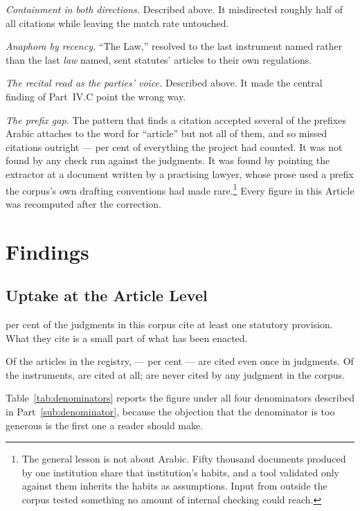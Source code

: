 \documentclass[12pt]{article}
\begin{document}
\emph{Containment in both directions.} Described above. It misdirected roughly
half of all citations while leaving the match rate untouched.

\emph{Anaphora by recency.} ``The Law,'' resolved to the last instrument named
rather than the last \emph{law} named, sent statutes' articles to their own
regulations.

\emph{The recital read as the parties' voice.} Described above. It made the
central finding of Part~IV.C point the wrong way.

\emph{The prefix gap.} The pattern that finds a citation accepted several of
the prefixes Arabic attaches to the word for ``article'' but not all of them,
and so missed \nPrefixGap{} citations outright --- \nPrefixGapShare{} per
cent of everything the project had counted. It was not
found by any check run against the judgments. It was found by pointing the
extractor at a document written by a practising lawyer, whose prose used a
prefix the corpus's own drafting conventions had made
rare.\footnote{The general lesson is not about Arabic. Fifty thousand
documents produced by one institution share that institution's habits, and a
tool validated only against them inherits the habits as assumptions. Input from
outside the corpus tested something no amount of internal checking could
reach.} Every figure in this Article was recomputed after the correction.

\section{Findings}
\label{sec:findings}

\subsection{Uptake at the Article Level}

\nJudgmentsCitingShare{} per cent of the judgments in this corpus cite at
least one statutory provision. What they cite is a small part of what has been
enacted.

Of the \nRegistryArticles{} articles in the registry, \nArticlesCited{} ---
\nArticlesCitedShare{} per cent --- are cited even once in
\nJudgments{} judgments. Of the \nInstruments{} instruments,
\nInstrumentsCited{} are cited at all; \nInstrumentsNever{} are never cited by
any judgment in the corpus.

Table~\ref{tab:denominators} reports the figure under all four denominators
described in Part~\ref{sub:denominator}, because the objection that the denominator is too
generous is the first one a reader should make.
\end{document}
